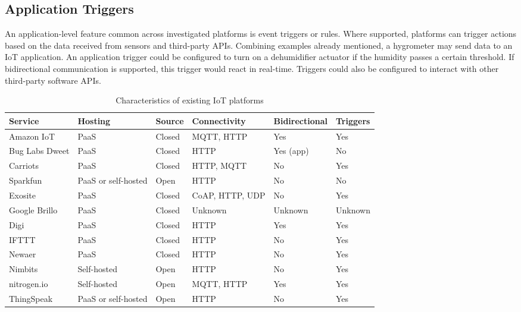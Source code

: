     \subsection{Application Triggers}
      An application-level feature common across investigated platforms is event triggers or rules. Where supported, platforms can trigger actions based on the data received from sensors and third-party APIs. Combining examples already mentioned, a hygrometer may send data to an IoT application. An application trigger could be configured to turn on a dehumidifier actuator if the humidity passes a certain threshold. If bidirectional communication is supported, this trigger would react in real-time. Triggers could also be configured to interact with other third-party software APIs.

      \begin{table}
        \scriptsize
        \begin{tabularx}{\textwidth}{|X|X|X|X|X|X|}
          \hline
          \textbf{Service} & \textbf{Hosting} & \textbf{Source} & \textbf{Connectivity} & \textbf{Bidirectional} & \textbf{Triggers} \\ \hline
          Amazon IoT & PaaS & Closed & MQTT, HTTP & Yes & Yes \\ \hline
          Bug Labs Dweet & PaaS & Closed & HTTP & Yes (app) & No \\ \hline
          Carriots & PaaS & Closed & HTTP, MQTT & No & Yes \\ \hline
          Sparkfun & PaaS or self-hosted & Open & HTTP & No & No \\ \hline
          Exosite & PaaS & Closed & CoAP, HTTP, UDP & No & Yes \\ \hline
          Google Brillo & PaaS & Closed & Unknown & Unknown & Unknown \\ \hline
          Digi & PaaS & Closed & HTTP & Yes & Yes \\ \hline
          IFTTT & PaaS & Closed & HTTP & No & Yes \\ \hline
          Newaer & PaaS & Closed & HTTP & No & Yes \\ \hline
          Nimbits & Self-hosted & Open & HTTP & No & Yes \\ \hline
          nitrogen.io & Self-hosted & Open & MQTT, HTTP & Yes & Yes \\ \hline
          ThingSpeak & PaaS or self-hosted & Open & HTTP & No & Yes \\ \hline
        \end{tabularx}

        \caption{Characteristics of existing IoT platforms}\label{platform-characteristics}
      \end{table}
